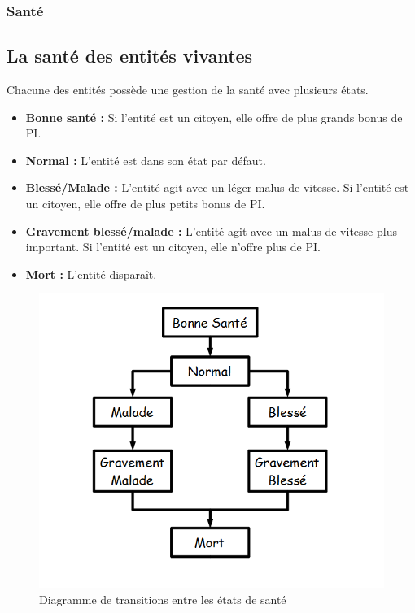 \documentclass[a4paper]{article}
\newcommand{\alinea}{\hspace*{0.5cm}}
\begin{document}
			\subsubsection{Santé}
				\subsection{La santé des entités vivantes}
					\alinea Chacune des entités possède une gestion de la santé avec plusieurs états.
					\begin{itemize} \small
						\item \textbf{Bonne santé :} Si l'entité est un citoyen, elle offre de plus grands bonus de PI.
						\item \textbf{Normal :} L'entité est dans son état par défaut.
						\item \textbf{Blessé/Malade :} L'entité agit avec un léger malus de vitesse. Si l'entité est un citoyen, elle offre de plus petits bonus de PI.
						\item \textbf{Gravement blessé/malade :} L'entité agit avec un malus de vitesse plus important. Si l'entité est un citoyen, elle n'offre plus de PI.
						\item \textbf{Mort :} L'entité disparaît.
					\end{itemize} \normalsize
					\begin{figure}
						\begin{center}
							\includegraphics[scale=0.5]{img/DiagrammeTransitionSante.png} 
						\end{center}
						\label{DiagSante}
							\caption{Diagramme de transitions entre les états de santé}
						\end{figure}	
			
\end{document}
